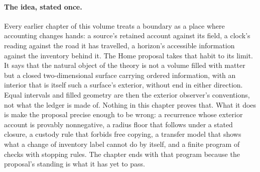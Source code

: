 \begin{abstract}
A Home is a closed two-dimensional ledger with an interior side and a parent-domain exterior side. What an exterior observer calls bulk volume is read as ordered information on that surface, and the surface's own completion can become the floor of a new interior, so that the construction continues as an endless chain of closed spheres, each the exterior of the next. This chapter carries the idea as an idea: the custody recurrence $E_{n+1}=E_n+I_n-O_n$ with its nonnegative exterior account, the conditional radius floor, the distinction between gross output and net growth, surface response, quantum custody and what an exterior observer can learn, the re-indexing of a completed boundary into a new floor, the formation-transfer model and its counterexample to an unsupported inference, the entropy ledger for receipts, and a finite program for deciding the fate proposal. The text is that of Sections 9--19 of the submitted Chapter XII, unchanged, renumbered as a chapter of its own.
\end{abstract}

\paragraph*{The idea, stated once.} Every earlier chapter of this volume treats a boundary as a place where accounting changes hands: a source's retained account against its field, a clock's reading against the road it has travelled, a horizon's accessible information against the inventory behind it. The Home proposal takes that habit to its limit. It says that the natural object of the theory is not a volume filled with matter but a closed two-dimensional surface carrying ordered information, with an interior that is itself such a surface's exterior, without end in either direction. Equal intervals and filled geometry are then the exterior observer's conventions, not what the ledger is made of. Nothing in this chapter proves that. What it does is make the proposal precise enough to be wrong: a recurrence whose exterior account is provably nonnegative, a radius floor that follows under a stated closure, a custody rule that forbids free copying, a transfer model that shows what a change of inventory label cannot do by itself, and a finite program of checks with stopping rules. The chapter ends with that program because the proposal's standing is what it has yet to pass.

